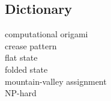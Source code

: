 \documentclass[english,12pt]{aghthesis}
\begin{document}
\subsection{Dictionary}
\begin{description}
	\item[computational origami]
	\item[crease pattern]
	\item[flat state]
	\item[folded state]
	\item[mountain-valley assignment]
	\item[NP-hard]
\end{description}

\section{\SectionTitleScope}
\label{sec:zakres-funkcjonalnosci}
\emph{}  

\section{\SectionTitleRealizationAspects}
\label{sec:wybrane-aspekty-realizacji}
\emph{}  

\section{\SectionTitleWorkOrganization}
\label{sec:organizacja-pracy}
\emph{} 

\section{\SectionTitleResults}
\label{sec:wyniki-projektu}
\emph{}  


\end{document}
